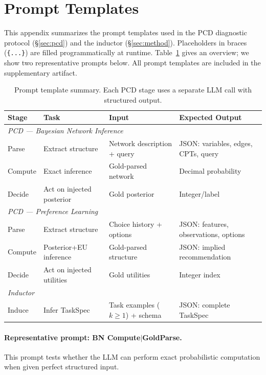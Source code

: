 \documentclass{article}
\begin{document}
\section{Prompt Templates}
\label{app:prompts}

This appendix summarizes the prompt templates used in the PCD diagnostic protocol (\S\ref{sec:pcd}) and the inductor (\S\ref{sec:method}).
Placeholders in braces (\texttt{\{...\}}) are filled programmatically at runtime.
Table~\ref{tab:prompt_summary} gives an overview; we show two representative prompts below.
All prompt templates are included in the supplementary artifact.

\begin{table}[ht]
\centering
\scriptsize
\caption{Prompt template summary. Each PCD stage uses a separate LLM call with structured output.}
\label{tab:prompt_summary}
\begin{tabular}{@{}llll@{}}
\toprule
Stage & Task & Input & Expected Output \\
\midrule
\multicolumn{4}{l}{\textit{PCD --- Bayesian Network Inference}} \\
Parse & Extract structure & Network description + query & JSON: variables, edges, CPTs, query \\
Compute & Exact inference & Gold-parsed network & Decimal probability \\
Decide & Act on injected posterior & Gold posterior & Integer/label \\
\midrule
\multicolumn{4}{l}{\textit{PCD --- Preference Learning}} \\
Parse & Extract structure & Choice history + options & JSON: features, observations, options \\
Compute & Posterior+EU inference & Gold-parsed structure & JSON: implied recommendation \\
Decide & Act on injected utilities & Gold utilities & Integer index \\
\midrule
\multicolumn{4}{l}{\textit{Inductor}} \\
Induce & Infer TaskSpec & Task examples ($k{\geq}1$) + schema & JSON: complete TaskSpec \\
\bottomrule
\end{tabular}
\end{table}

\paragraph{Representative prompt: BN Compute$\mid$GoldParse.}
This prompt tests whether the LLM can perform exact probabilistic computation when given perfect structured input.
\end{document}
